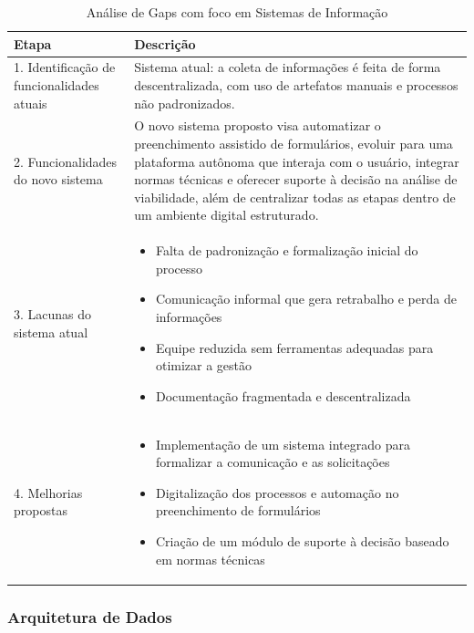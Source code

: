 \documentclass[12pt,a4paper]{article}
\begin{document}
\begin{table}[htbp]
\centering
\begin{tcolorbox}[enhanced, colback=white, colframe=gray!40, arc=3mm, boxrule=0.5pt, width=0.85\linewidth]
\begin{tabular}{|p{2cm}|p{9.5cm}|}
\hline
\rowcolor{gray!20}
\textbf{Etapa} & \textbf{Descrição} \\
\hline
1. Identificação de funcionalidades atuais & Sistema atual: a coleta de informações é feita de forma descentralizada, com uso de artefatos manuais e processos não padronizados. \\
\hline
2. Funcionalidades do novo sistema & O novo sistema proposto visa automatizar o preenchimento assistido de formulários, evoluir para uma plataforma autônoma que interaja com o usuário, integrar normas técnicas e oferecer suporte à decisão na análise de viabilidade, além de centralizar todas as etapas dentro de um ambiente digital estruturado. \\
\hline
3. Lacunas do sistema atual & \begin{itemize}\setlength{\itemsep}{0pt}
\item Falta de padronização e formalização inicial do processo
\item Comunicação informal que gera retrabalho e perda de informações
\item Equipe reduzida sem ferramentas adequadas para otimizar a gestão
\item Documentação fragmentada e descentralizada
\end{itemize} \\
\hline
4. Melhorias propostas & \begin{itemize}\setlength{\itemsep}{0pt}
\item Implementação de um sistema integrado para formalizar a comunicação e as solicitações
\item Digitalização dos processos e automação no preenchimento de formulários
\item Criação de um módulo de suporte à decisão baseado em normas técnicas
\end{itemize} \\
\hline
\end{tabular}
\end{tcolorbox}
\caption{Análise de Gaps com foco em Sistemas de Informação}
\end{table}

\clearpage
\subsubsection{Arquitetura de Dados}
\end{document}
